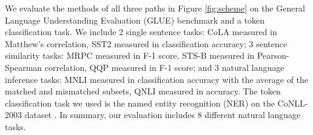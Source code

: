 \documentclass{article} %
\newcommand{\needcite}[1]{}
\newcommand{\needcite}{{\color{blue}{(cite)}}}
\begin{document}
We evaluate the methods of all three paths in Figure \ref{fig:scheme} on the General Language
Understanding Evaluation (GLUE) benchmark \citep{wang2019glue} and a token classification task.
We include 2 single sentence tasks: CoLA \citep{warstadt2018neural} measured in Matthew's correlation, SST2 \citep{socher2013recursive} measured in classification accuracy; 3 sentence similarity tasks: MRPC \citep{dolan2005microsoft} measured in F-1 score, STS-B \citep{cer-etal-2017-semeval} measured in Pearson-Spearman correlation, QQP \citep{chen2018quora} measured in F-1 score; and 3 natural
language inference tasks: MNLI \citep{williams2018broad} measured in classification accuracy with the average of the matched and mismatched subsets, QNLI \citep{rajpurkar2016squad} measured in accuracy. The token classification task we used is the named entity recognition (NER) on the CoNLL-2003 dataset \citep{sang2003introduction}. In summary, our evaluation includes 8 different natural language tasks.


\end{document}
